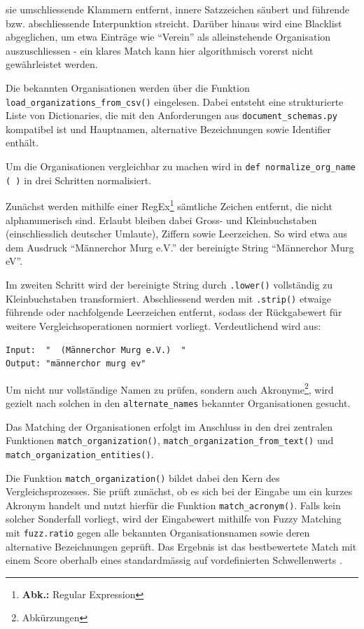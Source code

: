 \documentclass[12pt, a4paper, ngerman, bidi=default]{article}
\newcommand{\code}[1]{\colorbox{VeryLightGray}{\texttt{#1}}} %
\begin{document}
sie umschliessende Klammern entfernt, innere Satzzeichen säubert und führende bzw. abschliessende Interpunktion streicht. Darüber hinaus wird eine Blacklist abgeglichen, um etwa Einträge wie \enquote{Verein} als alleinstehende Organisation auszuschliessen - ein klares Match kann hier algorithmisch vorerst nicht gewährleistet werden.

Die bekannten Organisationen werden über die Funktion \code{load\_organizations\_from\_csv()} eingelesen. Dabei entsteht eine strukturierte Liste von Dictionaries, die mit den Anforderungen aus \code{document\_schemas.py} kompatibel ist und Hauptnamen, alternative Bezeichnungen sowie Identifier enthält.

Um die Organisationen vergleichbar zu machen wird in \code{def normalize\_org\_name ( )} in drei Schritten normalisiert.

Zunächst werden mithilfe einer RegEx\footnote{\textbf{Abk.:} Regular Expression} sämtliche Zeichen entfernt, die nicht alphanumerisch sind. Erlaubt bleiben dabei Gross- und Kleinbuchstaben (einschliesslich deutscher Umlaute), Ziffern sowie Leerzeichen. So wird etwa aus dem Ausdruck \enquote{Männerchor Murg e.V.} der bereinigte String \enquote{Männerchor Murg eV}.

Im zweiten Schritt wird der bereinigte String durch \code{.lower()} vollständig zu Kleinbuchstaben transformiert.
Abschliessend werden mit \code{.strip()} etwaige führende oder nachfolgende Leerzeichen entfernt, sodass der Rückgabewert für weitere Vergleichsoperationen normiert vorliegt. Verdeutlichend wird aus:
\begin{verbatim}
Input:  "  (Männerchor Murg e.V.)  "
Output: "männerchor murg ev"
\end{verbatim}
Um nicht nur vollständige Namen zu prüfen, sondern auch Akronyme\footnote{Abkürzungen}, wird gezielt nach solchen in den \texttt{alternate\_names} bekannter Organisationen gesucht.
 
Das Matching der Organisationen erfolgt im Anschluss in den drei zentralen Funktionen \code{match\_organization()}, \code{match\_organization\_from\_text()} und \code{match\_organization\_entities()}.

Die Funktion \code{match\_organization()} bildet dabei den Kern des Vergleichsprozesses. Sie prüft zunächst, ob es sich bei der Eingabe um ein kurzes Akronym handelt und nutzt hierfür die Funktion \code{match\_acronym()}. Falls kein solcher Sonderfall vorliegt, wird der Eingabewert mithilfe von Fuzzy Matching mit \code{fuzz.ratio} gegen alle bekannten Organisationsnamen sowie deren alternative Bezeichnungen geprüft. Das Ergebnis ist das bestbewertete Match mit einem Score oberhalb eines standardmässig auf vordefinierten Schwellenwerts .
\end{document}
